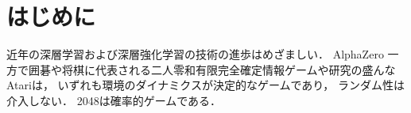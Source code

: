 \chapter{はじめに}
近年の深層学習および深層強化学習の技術の進歩はめざましい．
AlphaZero
一方で囲碁や将棋に代表される二人零和有限完全確定情報ゲームや研究の盛んなAtariは， いずれも環境のダイナミクスが決定的なゲームであり， ランダム性は介入しない．
2048は確率的ゲームである．